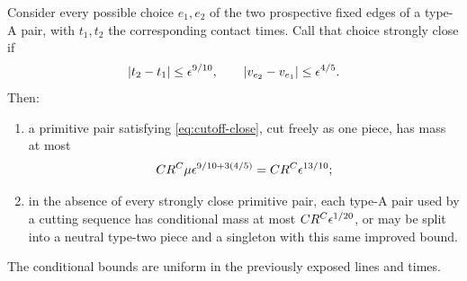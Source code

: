 \begin{lemma}\label{lem:cutoff-pair}
Consider every possible choice $e_1,e_2$ of the two prospective fixed
edges of a type-A pair, with $t_1,t_2$ the corresponding contact times.
Call that choice strongly close if
\begin{equation}\label{eq:cutoff-close}
 |t_2-t_1|\leq\epsilon^{9/10},\qquad
 |v_{e_2}-v_{e_1}|\leq\epsilon^{4/5}.
\end{equation}
Then:
\begin{enumerate}[label=\textup{(\roman*)}]
\item a primitive pair satisfying \eqref{eq:cutoff-close}, cut
freely as one piece, has mass at most
\begin{equation}\label{eq:cutoff-free-pair}
 C R^C\mu\epsilon^{9/10+3(4/5)}
 =C R^C\epsilon^{13/10};
\end{equation}
\item in the absence of every strongly close primitive pair, each
type-A pair used by a cutting sequence has conditional mass at most
\(C R^C\epsilon^{1/20}\), or may be split into a neutral type-two
piece and a singleton with this same improved bound.
\end{enumerate}
The conditional bounds are uniform in the previously exposed lines
and times.
\end{lemma}

